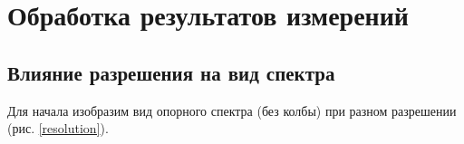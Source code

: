 \newpage
\section{Обработка результатов измерений}
\subsection{Влияние разрешения на вид спектра}
Для начала изобразим вид опорного спектра (без колбы) при разном разрешении (рис. \ref{resolution}).



